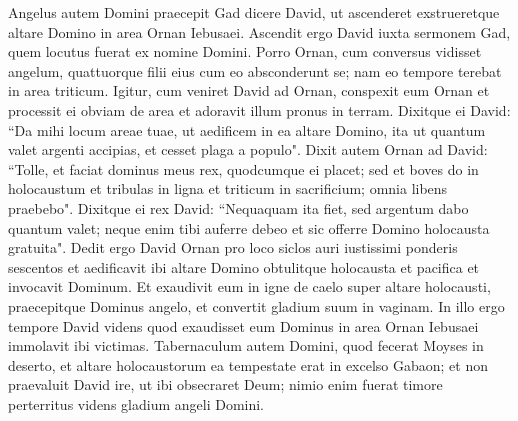 \begin{biblechapter}
\verse Angelus autem Domini praecepit Gad dicere David, ut ascenderet exstrueretque altare Domino in area Ornan Iebusaei. 
\verse Ascendit ergo David iuxta sermonem Gad, quem locutus fuerat ex nomine Domini. 
\verse Porro Ornan, cum conversus vidisset angelum, quattuorque filii eius cum eo absconderunt se; nam eo tempore terebat in area triticum. 
\verse Igitur, cum veniret David ad Ornan, conspexit eum Ornan et processit ei obviam de area et adoravit illum pronus in terram.  
\verse Dixitque ei David: “Da mihi locum areae tuae, ut aedificem in ea altare Domino, ita ut quantum valet argenti accipias, et cesset plaga a populo".  
\verse Dixit autem Ornan ad David: “Tolle, et faciat dominus meus rex, quodcumque ei placet; sed et boves do in holocaustum et tribulas in ligna et triticum in sacrificium; omnia libens praebebo". 
\verse Dixitque ei rex David: “Nequaquam ita fiet, sed argentum dabo quantum valet; neque enim tibi auferre debeo et sic offerre Domino holocausta gratuita". 
\verse Dedit ergo David Ornan pro loco siclos auri iustissimi ponderis sescentos  
\verse et aedificavit ibi altare Domino obtulitque holocausta et pacifica et invocavit Dominum. Et exaudivit eum in igne de caelo super altare holocausti,  
\verse praecepitque Dominus angelo, et convertit gladium suum in vaginam. 
\verse In illo ergo tempore David videns quod exaudisset eum Dominus in area Ornan Iebusaei immolavit ibi victimas. 
\verse Tabernaculum autem Domini, quod fecerat Moyses in deserto, et altare holocaustorum ea tempestate erat in excelso Gabaon; 
\verse et non praevaluit David ire, ut ibi obsecraret Deum; nimio enim fuerat timore perterritus videns gladium angeli Domini. 
\end{biblechapter}

